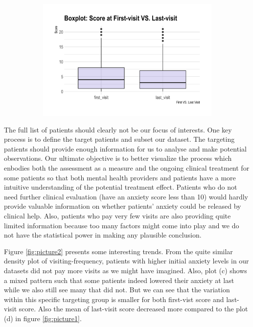 \documentclass[11pt]{article}
\begin{document}
\begin{figure}[htb!]
\begin{subfigure}[h]{0.48\linewidth}
		\caption{}\label{fig:p3}
	\end{subfigure}
	\hfill
	\begin{subfigure}[h]{0.48\linewidth}
	\includegraphics[width=\linewidth]{Figures/p4.png}
	\caption{}\label{fig:p4}
	\end{subfigure}
\end{figure}

The full list of patients should clearly not be our focus of interests. One key process is to define the target patients and subset our dataset. The targeting patients should provide enough information for us to analyse and make potential observations. Our ultimate objective is to better visualize the process which enbodies both the assessment as a measure and the ongoing clinical treatment for some patients so that both mental health providers and patients have a more intuitive understanding of the potential treatment effect. Patients who do not need further clinical evaluation (have an anxiety score less than 10) would hardly provide valuable information on whether patients' anxiety could be released by clinical help. Also, patients who pay very few visits are also providing quite limited information because too many factors might come into play and we do not have the statistical power in making any plausible conclusion. 

Figure \ref{fig:picture2} presents some interesting trends. From the quite similar density plot of visiting-frequency, patients with higher initial anxiety levels in our datasets did not pay more visits as we might have imagined. Also, plot (c) shows a mixed pattern such that some patients indeed lowered their anxiety at last while we also still see many that did not. But we can see that the variation within this specific targeting group is smaller for both first-vist score and last-visit score. Also the mean of last-visit score decreased more compared to the plot (d) in figure \ref{fig:picture1}.
\end{document}
